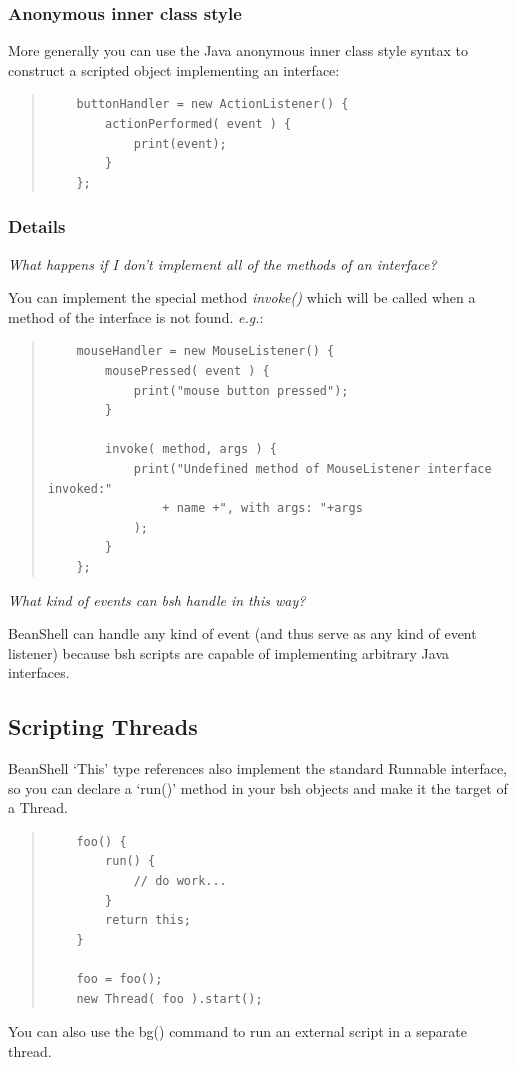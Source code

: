 \documentclass[twoside,11pt]{article}
\renewcommand{\_}{\texttt{\symbol{95}}}
\newcommand{\eg}{\textit{e.g.}}
\begin{document}
\subsubsection{Anonymous inner class style}
More generally you can use the Java anonymous inner class style syntax
to construct a scripted object implementing an interface:
\begin{quote}
\begin{verbatim}
    buttonHandler = new ActionListener() {
        actionPerformed( event ) {
            print(event);
        }
    };
\end{verbatim}
\end{quote}

\subsubsection{Details}
\textit{What happens if I don't implement all of the methods of an
interface?}

You can implement the special method \textit{invoke()} which will be
called when a method of the interface is not found. \eg:
\begin{quote}
\begin{verbatim}
    mouseHandler = new MouseListener() {
        mousePressed( event ) {
            print("mouse button pressed");
        }

        invoke( method, args ) {
            print("Undefined method of MouseListener interface invoked:"
                + name +", with args: "+args
            );
        }
    };
\end{verbatim}
\end{quote}

\textit{What kind of events can bsh handle in this way?}

BeanShell can handle any kind of event (and thus serve as any kind of
event listener) because bsh scripts are capable of implementing
arbitrary Java interfaces.

\subsection{Scripting Threads}

BeanShell `This' type references also implement the standard
Runnable interface, so you can declare a `run()' method in
your bsh objects and make it the target of a Thread.
\begin{quote}
\begin{verbatim}
    foo() {
        run() {
            // do work...
        }
        return this;
    }

    foo = foo();
    new Thread( foo ).start();
\end{verbatim}
\end{quote}
You can also use the bg() command to run an external script in a separate
thread.
\end{document}
